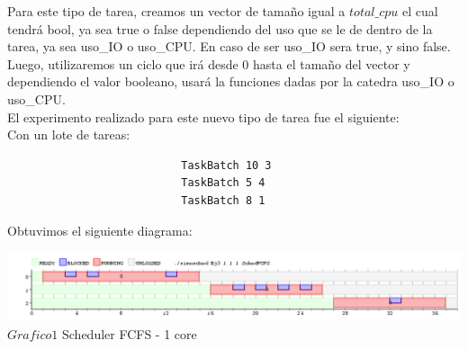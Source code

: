  \indent Para este tipo de tarea, creamos un vector de tamaño igual a $total\_cpu$ el cual tendrá bool, ya sea true o false
 dependiendo del uso que se le de dentro de la tarea, ya sea uso\_IO o uso\_CPU. En caso de ser uso\_IO sera true, y sino false.\\
 Luego, utilizaremos un ciclo que irá desde 0 hasta el tamaño del vector y dependiendo el valor booleano, usará la funciones
 dadas por la catedra uso\_IO o uso\_CPU.\\
 
 \indent El experimento realizado para este nuevo tipo de tarea fue el siguiente:\\
 
 Con un lote de tareas:\\
 
 \begin{verbatim}
                           TaskBatch 10 3
                           TaskBatch 5 4
                           TaskBatch 8 1
 \end{verbatim}

 Obtuvimos el siguiente diagrama:\\
 
 \vspace*{0.3cm} \vspace*{0.3cm}
  \begin{center}
 \includegraphics[scale=0.5]{./Test/ej3.png}
 { $Grafico 1$ Scheduler FCFS - 1 core }
 \end{center}
  \vspace*{0.3cm}
 
